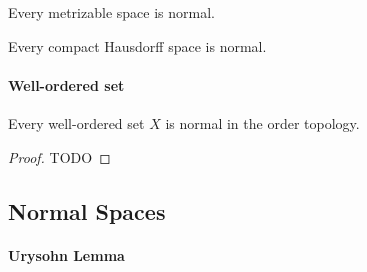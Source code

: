 \begin{theorem}
  Every metrizable space is normal.
\end{theorem}

\begin{theorem}
  Every compact Hausdorff space is normal.
\end{theorem}

\paragraph{Well-ordered set}

\begin{theorem}
  Every well-ordered set \( X \) is normal in the order topology.
\end{theorem}
\begin{proof}
  TODO %
\end{proof}

\subsection{Normal Spaces}

\paragraph{Urysohn Lemma}

